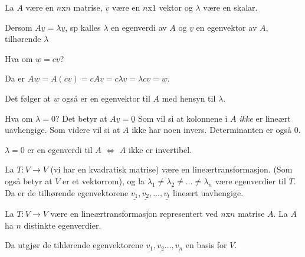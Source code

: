 \documentclass[11pt, a4paper, norsk]{article}
\begin{document}
        \begin{Definition}{}{}
            La $A$ være en $n$x$n$ matrise, $\underline{v}$ være en $n$x$1$ vektor og $\lambda$ være en skalar.

            Dersom $A\underline{v} = \lambda \underline{v}$, sp kalles $\lambda$ en egenverdi av $A$ og $\underline{v}$ en egenvektor av $A$, tilhørende $\lambda$
        \end{Definition}

        Hva om $\underline{w} = c\underline{v}$?

        Da er $A\underline{w} = A(c\underline{v}) = cA\underline{v} = c\lambda\underline{v} = \lambda c\underline{v} = \underline{w}$.

        Det følger at $\underline{w}$ også er en egenvektor til $A$ med hensyn til $\lambda$. 


        Hva om $\lambda = 0$? Det betyr at $A\underline{v} = \underline{0}$ Som vil si at kolonnene i $A$ \textit{ikke} er lineært uavhengige. Som videre vil si at $A$ ikke har noen invers. Determinanten er også $0$.

        \begin{Theorem}{}{}
            $\lambda = 0$ er en egenverdi til $A$ $\iff$ $A$ ikke er invertibel. 
        \end{Theorem}

        \begin{Theorem}{}{}
            La $T:V\rightarrow V$ (vi har en kvadratisk matrise) være en lineærtransformasjon. (Som også betyr at $V$ er et vektorrom), og la $\lambda_{1} \neq \lambda_{2} \neq \dots \neq \lambda_{n}$ være egenverdier til $T$. Da er de tilhørende egenvektorene $\underline{v_{1}}, \underline{v_2}, \dots ,\underline{v_{t}}$ lineært uavhengige.
        \end{Theorem}

        \begin{Theorem}{}{}
            La $T:V\rightarrow V$ være en lineærtransformasjon representert ved $n$x$n$ matrise $A$. La $A$ ha $n$ distinkte egenverdier. 

            Da utgjør de tihlørende egenvektorene $\underline{v_1}, \underline{v_2} \dots ,\underline{v_{n}}$ en basis for $V$. 
        \end{Theorem}
\end{document}

